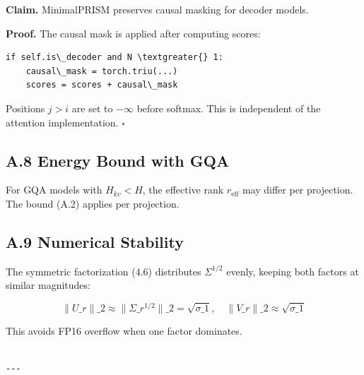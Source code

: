 \textbf{Claim.} MinimalPRISM preserves causal masking for decoder models.

\textbf{Proof.} The causal mask is applied after computing scores:

\begin{lstlisting}
if self.is\_decoder and N \textgreater{} 1:
    causal\_mask = torch.triu(...)
    scores = scores + causal\_mask
\end{lstlisting}

Positions $j > i$ are set to $-\infty$ before softmax. This is independent 
of the attention implementation. $\square$

\subsection{A.8 Energy Bound with GQA}

For GQA models with $H_{kv} < H$, the effective rank $r_\text{eff}$ may 
differ per projection. The bound (A.2) applies per projection.

\subsection{A.9 Numerical Stability}

The symmetric factorization (4.6) distributes $\Sigma^{1/2}$ evenly, keeping 
both factors at similar magnitudes:

\[
\|U\_r\|\_2 \approx \|\Sigma\_r^{1/2}\|\_2 = \sqrt{\sigma\_1}, \quad
\|V\_r\|\_2 \approx \sqrt{\sigma\_1}
\tag{A.5}
\]

This avoids FP16 overflow when one factor dominates.
\begin{lstlisting}

---
\end{lstlisting}